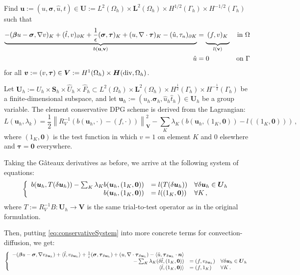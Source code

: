 \documentclass[letterpaper]{article}
\def\btau{\boldsymbol\tau}
\def\bsigma{\boldsymbol\sigma}
\def\bbeta{\boldsymbol\beta}
\newcommand{\bs}[1]{\boldsymbol{#1}}
\newcommand{\norm}[1]{\left\| #1 \right\|}
\newcommand{\bfH}{\mbox{\boldmath $H$}}
\newcommand{\vdeltau}{v_{\delta\bs u_h}}
\newcommand{\taudeltau}{\btau_{\delta\bs u_h}}
\begin{document}
Find
$\bs u:=(u,\bsigma,\hat u,\hat t)
\in\bs U:=L^2(\Omega_h)\times \bs L^2(\Omega_h)\times H^{1/2}(\Gamma_h)\times H^{-1/2}(\Gamma_h)$
such that
\begin{align}
\label{eq:variationalFormulation}
\underbrace{-(\bbeta u-\bsigma,\nabla v)_K+(\hat t,v)_{\partial K}
+ \frac{1}{\epsilon}(\bsigma,\btau)_K
+(u,\nabla\cdot\btau)_K
-(\hat u,\tau_n)_{\partial K}}_{b(\mathbf{u}, \mathbf{v})}
&=\underbrace{\:(f,v)_K\genfrac{}{}{0pt}{}{}{}}_{l(\mathbf{v})} &\text{in }\Omega \\
\hat u&=0 &\text{on }\Gamma
\end{align}
for all $\bs v:=(v,\btau)\in
\bs V:=H^1(\Omega_h)\times\bfH(\text{div},\Omega_h)$.

Let $\bs U_h:=U_h\times\bs S_h\times\hat U_h\times\hat F_h\subset L^2(\Omega_h)\times\bs
L^2(\Omega_h)\times H^{\frac{1}{2}}(\Gamma_h)\times H^{-\frac{1}{2}}(\Gamma_h)$
be a finite-dimensional subspace, and let $\bs u_h:=(u_h.\bsigma_h,\hat
u_h\hat t_h)\in\bs U_h$ be a group variable. The element conservative DPG scheme is
derived from the Lagrangian:
\begin{equation}
L(\bs u_h,\lambda_k)=\frac{1}{2}\norm{R_V^{-1}(b(\bs
u_h,\cdot)-(f,\cdot))}^2_{\bs V}-\sum_K\lambda_K(b(\bs u_h,(1_K,\bs0))-l((1_K,\bs0)))\,,
\label{eq:lagrangian}
\end{equation}
where $(1_K,\bs0)$ is the test function in which $v=1$ on element $K$ and 0 elsewhere and $\btau=\bs0$ everywhere.

Taking the G\^ateaux derivatives as before, we arrive at the following system
of equations:
\begin{equation}
\left\{
\begin{array}[c]{rll}
b(\bs u_h,T(\delta\bs u_h))-\sum_K\lambda_K b(\bs u_h,(1_K,\bs0))
&=l(T(\delta\bs u_h)) & \forall\delta\bs u_h\in\bs U_h\\
b(\bs u_h,(1_K,\bs0)) &=l((1_K,\bs0)) & \forall K\,,
\end{array}
\right.
\label{eq:conservativeSystem}
\end{equation}
where $T:=R_V^{-1}B:\bs U_h\rightarrow\bs V$ is the same trial-to-test operator as in the original formulation.

Then, putting \eqref{eq:conservativeSystem} into more concrete terms for
convection-diffusion, we get:
\begin{equation}
\left\{
\begin{array}[c]{rll}
-(\bbeta u-\bsigma,\nabla \vdeltau)+\langle\hat t,\vdeltau\rangle
+ \frac{1}{\epsilon}(\bsigma,\taudeltau)
+(u,\nabla\cdot\taudeltau)
-\langle\hat u,\taudeltau\cdot\bs n\rangle\\
-\sum_K\lambda_K (\delta\hat t,(1_K,\bs0))
&=(f,\vdeltau) & \forall\delta\bs u_h\in\bs U_h\\
\langle\hat t,(1_K,\bs0)\rangle &=(f,1_K) & \forall K\,.
\end{array}
\right.
\label{eq:conservativeConfusionSystem}
\end{equation}
\end{document}
